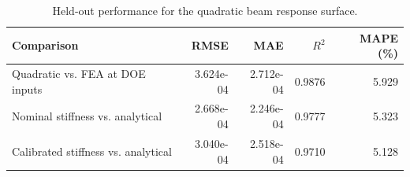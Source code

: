 \begin{table}[htbp]
\centering
\caption{Held-out performance for the quadratic beam response surface.}
\label{tab:quadratic-validation}
\begin{tabular}{lrrrr}
\toprule
Comparison & RMSE & MAE & $R^2$ & MAPE (\%) \\
\midrule
Quadratic vs. FEA at DOE inputs & 3.624e-04 & 2.712e-04 & 0.9876 & 5.929 \\
Nominal stiffness vs. analytical & 2.668e-04 & 2.246e-04 & 0.9777 & 5.323 \\
Calibrated stiffness vs. analytical & 3.040e-04 & 2.518e-04 & 0.9710 & 5.128 \\
\bottomrule
\end{tabular}
\end{table}
